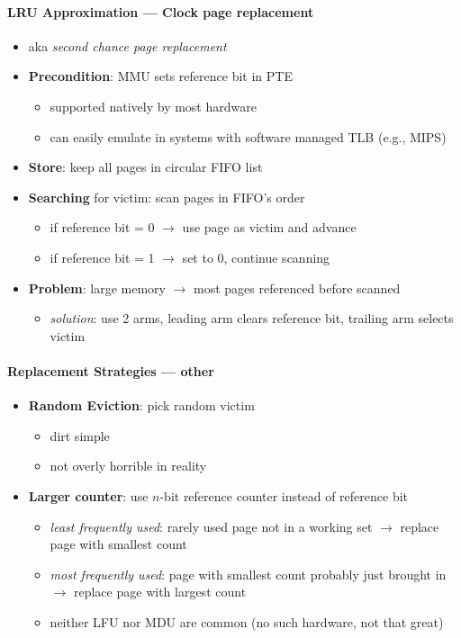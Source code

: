 \paragraph{LRU Approximation --- Clock page replacement}
\begin{itemize}
  \item aka \emph{second chance page replacement}
  \item \textbf{Precondition}: MMU sets reference bit in PTE
  \begin{itemize}
    \item supported natively by most hardware
    \item can easily emulate in systems with software managed TLB (e.g., MIPS)
  \end{itemize}
  \item \textbf{Store}: keep all pages in circular FIFO list
  \item \textbf{Searching} for victim: scan pages in FIFO's order
  \begin{itemize}
     \item if reference bit = 0 $ \to $ use page as victim and advance
     \item if reference bit = 1 $ \to $ set to 0, continue scanning
  \end{itemize}
  \item \textbf{Problem}: large memory $ \to $ most pages referenced before scanned
  \begin{itemize}
    \item \emph{solution}: use 2 arms, leading arm clears reference bit, trailing arm selects victim
  \end{itemize}
\end{itemize}

\paragraph{Replacement Strategies --- other}
\begin{itemize}
  \item \textbf{Random Eviction}: pick random victim
  \begin{itemize}
    \item dirt simple
    \item not overly horrible in reality
  \end{itemize}
  \item \textbf{Larger counter}: use $ n $-bit reference counter instead of reference bit
  \begin{itemize}
    \item \emph{least frequently used}: rarely used page not in a working set $ \to $ replace page with smallest count
    \item \emph{most frequently used}: page with smallest count probably just brought in $ \to $ replace page with largest count
    \item neither LFU nor MDU are common (no such hardware, not that great)
  \end{itemize}
\end{itemize}

